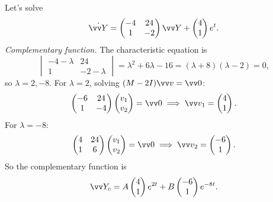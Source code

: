 \begin{example}
	Let's solve
	$$
	\dot{\vv Y} = \begin{pmatrix} -4 & 24 \\ 1 & -2 \end{pmatrix} \vv Y + \begin{pmatrix} 4 \\ 1 \end{pmatrix} e^t.
	$$
	\emph{Complementary function.} The characteristic equation is
	$$
	\begin{vmatrix} -4 - \lambda & 24 \\ 1 & -2 - \lambda \end{vmatrix} = \lambda^2 + 6\lambda - 16 = (\lambda + 8)(\lambda - 2) = 0,
	$$
	so $\lambda = 2, -8$. For $\lambda = 2$, solving $(M - 2I)\vv v = \vv 0$:
	$$
	\begin{pmatrix} -6 & 24 \\ 1 & -4 \end{pmatrix}\begin{pmatrix} v_1 \\ v_2\end{pmatrix} = \vv 0 \implies \vv v_1 = \begin{pmatrix} 4 \\ 1 \end{pmatrix}.
	$$
	For $\lambda = -8$:
	$$
	\begin{pmatrix} 4 & 24 \\ 1 & 6 \end{pmatrix} \begin{pmatrix} v_1 \\ v_2 \end{pmatrix} = \vv 0 \implies \vv v_2 = \begin{pmatrix} -6 \\ 1 \end{pmatrix}.
	$$
	So the complementary function is
	$$
	\vv Y_c = A \begin{pmatrix} 4 \\ 1\end{pmatrix} e^{2t} + B \begin{pmatrix} -6 \\ 1 \end{pmatrix} e^{-8t}.
	$$


\end{example}
